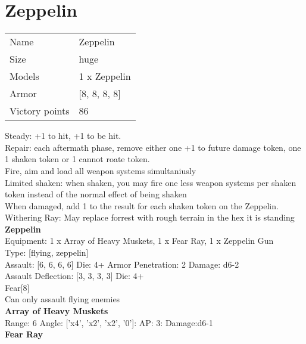 \pagebreak

\section{ Zeppelin }

\begin{tabular}{ll}
  Name & Zeppelin \\
  Size & huge\\
  Models & 1 x Zeppelin\\
  Armor & [8, 8, 8, 8]\\
  Victory points & 86\\
\end{tabular}

Steady: +1 to hit, +1 to be hit.\\ 
Repair: each aftermath phase, remove either one +1 to future damage token, one 1 shaken token or 1 cannot roate token.\\ 
Fire, aim and load all weapon systems simultaniusly\\ 
Limited shaken: when shaken, you may fire one less weapon systems per shaken token instead of the normal effect of being shaken\\ 
 When damaged, add 1 to the result for each shaken token on the Zeppelin.\\ 
Withering Ray: May replace forrest with rough terrain in the hex it is standing\\ 


{\bf Zeppelin } \\
Equipment: 1 x Array of Heavy Muskets, 1 x Fear Ray, 1 x Zeppelin Gun \\
Type: [flying, zeppelin] \\

Assault: [6, 6, 6, 6] Die: 4+ Armor Penetration: 2 Damage: d6-2 \\
Assault Deflection: [3, 3, 3, 3] Die: 4+\\
\indent Fear[8]\\ 
Can only assault flying enemies\\ 
 



{\bf Array of Heavy Muskets } \\



Range: 6  Angle: ['x4', 'x2', 'x2', '0']: AP: 3: Damage:d6-1 \\




{\bf Fear Ray } \\



